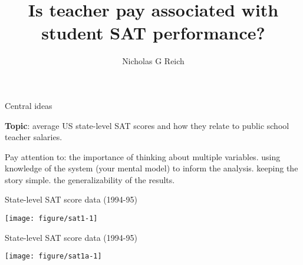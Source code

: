 \documentclass[table]{beamer}\usepackage[]{graphicx}\usepackage[]{color}
\title{Is teacher pay associated with student SAT performance?}
\author{Nicholas G Reich}
\makeatletter
\def\maxwidth{ %
  \ifdim\Gin@nat@width>\linewidth
    \linewidth
  \else
    \Gin@nat@width
  \fi
}
\newenvironment{knitrout}{}{} %
\makeatother
\begin{document}
\begin{frame}[plain]
	\titlepage
\end{frame}






\begin{frame}{Central ideas}

{\bf Topic}: average US state-level SAT scores and how they relate to public school teacher salaries.

\vspace{2em}

\begin{block}{Pay attention to:}
\bi
	\myitem the importance of thinking about multiple variables.
	\myitem using knowledge of the system (your mental model) to inform the analysis.
	\myitem keeping the story simple.
	\myitem the generalizability of the results.
\ei
\end{block}

\end{frame}


\begin{frame}[fragile]{State-level SAT score data (1994-95)}

\begin{knitrout}
\color{fgcolor}
\texttt{[image: figure/sat1-1]} 

\end{knitrout}


\end{frame}








\begin{frame}[fragile]{State-level SAT score data (1994-95)}

\begin{knitrout}
\color{fgcolor}
\texttt{[image: figure/sat1a-1]} 

\end{knitrout}


\end{frame}
\end{document}

